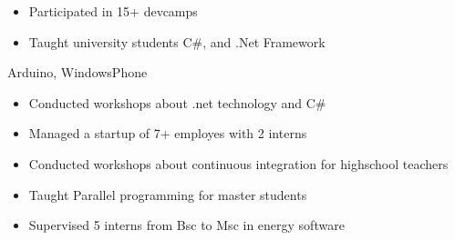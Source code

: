 \documentclass[10pt,a4paper,ragged2e,withhyper]{altacv}
\begin{document}
\begin{paracol}{2}
  \divider

  \begin{itemize}
    \item Participated in 15+ devcamps
    \item Taught university students C\#, and .Net Framework
  \end{itemize}



   { Arduino, WindowsPhone}















  \medskip

  \medskip
  \begin{itemize}
    \item Conducted workshops about .net technology and C\#
    \item Managed a startup of 7+ employes with 2 interns
    \item Conducted workshops about continuous integration for highschool teachers
    \item Taught Parallel programming for master students
    \item Supervised 5 interns from Bsc to Msc in energy software
  \end{itemize}


\end{paracol}
\end{document}
